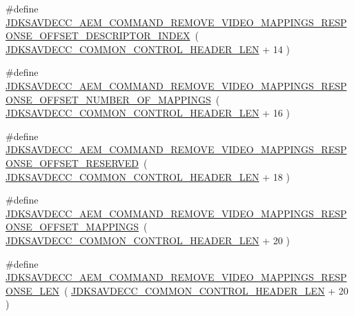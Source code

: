 \begin{DoxyCompactItemize}
\item 
\#define \hyperlink{group__command__remove__video__mappings__response_ga7535218248ef9f465ef81cff9065e2d1}{J\+D\+K\+S\+A\+V\+D\+E\+C\+C\+\_\+\+A\+E\+M\+\_\+\+C\+O\+M\+M\+A\+N\+D\+\_\+\+R\+E\+M\+O\+V\+E\+\_\+\+V\+I\+D\+E\+O\+\_\+\+M\+A\+P\+P\+I\+N\+G\+S\+\_\+\+R\+E\+S\+P\+O\+N\+S\+E\+\_\+\+O\+F\+F\+S\+E\+T\+\_\+\+D\+E\+S\+C\+R\+I\+P\+T\+O\+R\+\_\+\+I\+N\+D\+EX}~( \hyperlink{group__jdksavdecc__avtp__common__control__header_gaae84052886fb1bb42f3bc5f85b741dff}{J\+D\+K\+S\+A\+V\+D\+E\+C\+C\+\_\+\+C\+O\+M\+M\+O\+N\+\_\+\+C\+O\+N\+T\+R\+O\+L\+\_\+\+H\+E\+A\+D\+E\+R\+\_\+\+L\+EN} + 14 )
\item 
\#define \hyperlink{group__command__remove__video__mappings__response_ga587dd7b4a4ada44d0845c6c9ae79df63}{J\+D\+K\+S\+A\+V\+D\+E\+C\+C\+\_\+\+A\+E\+M\+\_\+\+C\+O\+M\+M\+A\+N\+D\+\_\+\+R\+E\+M\+O\+V\+E\+\_\+\+V\+I\+D\+E\+O\+\_\+\+M\+A\+P\+P\+I\+N\+G\+S\+\_\+\+R\+E\+S\+P\+O\+N\+S\+E\+\_\+\+O\+F\+F\+S\+E\+T\+\_\+\+N\+U\+M\+B\+E\+R\+\_\+\+O\+F\+\_\+\+M\+A\+P\+P\+I\+N\+GS}~( \hyperlink{group__jdksavdecc__avtp__common__control__header_gaae84052886fb1bb42f3bc5f85b741dff}{J\+D\+K\+S\+A\+V\+D\+E\+C\+C\+\_\+\+C\+O\+M\+M\+O\+N\+\_\+\+C\+O\+N\+T\+R\+O\+L\+\_\+\+H\+E\+A\+D\+E\+R\+\_\+\+L\+EN} + 16 )
\item 
\#define \hyperlink{group__command__remove__video__mappings__response_gaa86cee1137b7caca0a9739ce4131c2e2}{J\+D\+K\+S\+A\+V\+D\+E\+C\+C\+\_\+\+A\+E\+M\+\_\+\+C\+O\+M\+M\+A\+N\+D\+\_\+\+R\+E\+M\+O\+V\+E\+\_\+\+V\+I\+D\+E\+O\+\_\+\+M\+A\+P\+P\+I\+N\+G\+S\+\_\+\+R\+E\+S\+P\+O\+N\+S\+E\+\_\+\+O\+F\+F\+S\+E\+T\+\_\+\+R\+E\+S\+E\+R\+V\+ED}~( \hyperlink{group__jdksavdecc__avtp__common__control__header_gaae84052886fb1bb42f3bc5f85b741dff}{J\+D\+K\+S\+A\+V\+D\+E\+C\+C\+\_\+\+C\+O\+M\+M\+O\+N\+\_\+\+C\+O\+N\+T\+R\+O\+L\+\_\+\+H\+E\+A\+D\+E\+R\+\_\+\+L\+EN} + 18 )
\item 
\#define \hyperlink{group__command__remove__video__mappings__response_gaa7b2c4a4287b942166474fb0c9df2644}{J\+D\+K\+S\+A\+V\+D\+E\+C\+C\+\_\+\+A\+E\+M\+\_\+\+C\+O\+M\+M\+A\+N\+D\+\_\+\+R\+E\+M\+O\+V\+E\+\_\+\+V\+I\+D\+E\+O\+\_\+\+M\+A\+P\+P\+I\+N\+G\+S\+\_\+\+R\+E\+S\+P\+O\+N\+S\+E\+\_\+\+O\+F\+F\+S\+E\+T\+\_\+\+M\+A\+P\+P\+I\+N\+GS}~( \hyperlink{group__jdksavdecc__avtp__common__control__header_gaae84052886fb1bb42f3bc5f85b741dff}{J\+D\+K\+S\+A\+V\+D\+E\+C\+C\+\_\+\+C\+O\+M\+M\+O\+N\+\_\+\+C\+O\+N\+T\+R\+O\+L\+\_\+\+H\+E\+A\+D\+E\+R\+\_\+\+L\+EN} + 20 )
\item 
\#define \hyperlink{group__command__remove__video__mappings__response_gacb5495d81e47c52e609b619e18067a38}{J\+D\+K\+S\+A\+V\+D\+E\+C\+C\+\_\+\+A\+E\+M\+\_\+\+C\+O\+M\+M\+A\+N\+D\+\_\+\+R\+E\+M\+O\+V\+E\+\_\+\+V\+I\+D\+E\+O\+\_\+\+M\+A\+P\+P\+I\+N\+G\+S\+\_\+\+R\+E\+S\+P\+O\+N\+S\+E\+\_\+\+L\+EN}~( \hyperlink{group__jdksavdecc__avtp__common__control__header_gaae84052886fb1bb42f3bc5f85b741dff}{J\+D\+K\+S\+A\+V\+D\+E\+C\+C\+\_\+\+C\+O\+M\+M\+O\+N\+\_\+\+C\+O\+N\+T\+R\+O\+L\+\_\+\+H\+E\+A\+D\+E\+R\+\_\+\+L\+EN} + 20 )
\end{DoxyCompactItemize}
